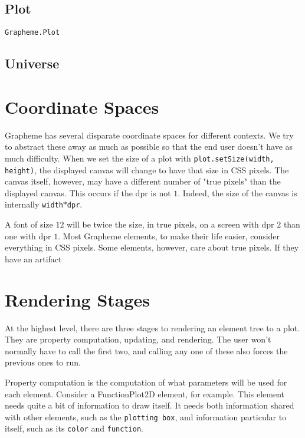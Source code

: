 \documentclass{article}
\begin{document}
\subsection{Plot}

\texttt{Grapheme.Plot}

\subsection{Universe}

\section{Coordinate Spaces}

Grapheme has several disparate coordinate spaces for different contexts. We try to abstract these away as much as possible so that the end user doesn't have as much difficulty. When we set the size of a plot with \texttt{plot.setSize(width, height)}, the displayed canvas will change to have that size in CSS pixels. The canvas itself, however, may have a different number of "true pixels" than the displayed canvas. This occurs if the dpr is not $1$. Indeed, the size of the canvas is internally \texttt{width}$*$\texttt{dpr}.

A font of size $12$ will be twice the size, in true pixels, on a screen with dpr $2$ than one with dpr $1$. Most Grapheme elements, to make their life easier, consider everything in CSS pixels. Some elements, however, care about true pixels. If they have an artifact

\section{Rendering Stages}

At the highest level, there are three stages to rendering an element tree to a plot. They are property computation, updating, and rendering. The user won't normally have to call the first two, and calling any one of these also forces the previous ones to run.

Property computation is the computation of what parameters will be used for each element. Consider a FunctionPlot2D element, for example. This element needs quite a bit of information to draw itself. It needs both information shared with other elements, such as the \texttt{plotting box}, and information particular to itself, such as its \texttt{color} and \texttt{function}.
\end{document}
